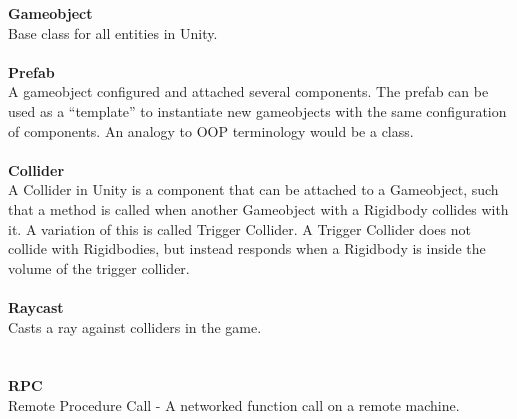 \textbf{Gameobject}\vspace{4pt}\\
Base class for all entities in Unity.\cite{prefaceGameobject}\\
\\
\textbf{Prefab}\vspace{4pt}\\
A gameobject configured and attached several components. The prefab can be used as a ``template'' to instantiate new gameobjects with the same configuration of components.
An analogy to OOP terminology would be a class.\\
\\
\textbf{Collider}\vspace{4pt}\\
A Collider in Unity is a component that can be attached to a Gameobject, such that a method is called when another Gameobject with a Rigidbody\cite{rigidbody} collides with it.\cite{collider2d}
A variation of this is called Trigger Collider.
A Trigger Collider does not collide with Rigidbodies, but instead responds when a Rigidbody is inside the volume of the trigger collider.\cite{collider2dtrigger}\\
\\
\textbf{Raycast}\vspace{4pt}\\
Casts a ray against colliders in the game. \cite{raycast}\\
\\
\\
\textbf{RPC}\vspace{4pt}\\
Remote Procedure Call - A networked function call on a remote machine. \cite{rpc}\\
\\